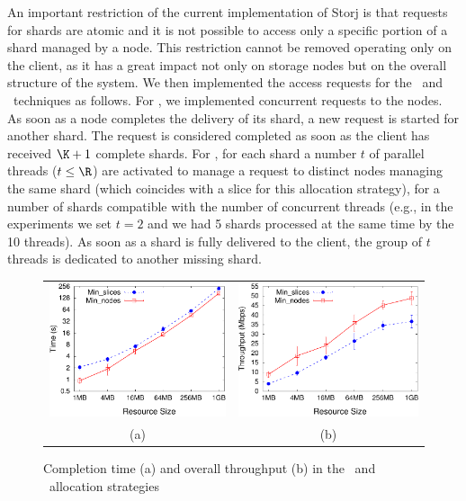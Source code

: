 An important restriction of the current implementation of Storj is
that requests for shards are atomic and it is not possible to access
only a specific portion of a shard managed by a node. This restriction
cannot be removed operating only on the client, as it has a great
impact not only on storage nodes but on the overall structure of the
system.  We then implemented the access requests for the
\diagonal\ and \compact\ techniques as follows.  For \compact, we
implemented concurrent requests to the nodes. As soon as a node
completes the delivery of its shard, a new request is started for
another shard. The request is considered completed as soon as the
client has received $\K+1$ complete shards. For \diagonal, for each
shard a number $t$ of parallel threads ($t \leq \R$) are activated to
manage a request to distinct nodes managing the same shard (which
coincides with a slice for this allocation strategy), for a number of
shards compatible with the number of concurrent threads (e.g., in the
experiments we set $t=2$ and we had 5 shards processed at the same
time by the 10 threads). As soon as a shard is fully delivered to the
client, the group of $t$ threads is dedicated to another missing
shard.

\begin{figure}[!t]
	\centering
	\hspace*{-8pt}
       \begin{tabular}{cc} \includegraphics[width=0.475\columnwidth]{./figures/bdfprs-fig09a} &
\includegraphics[width=0.475\columnwidth]{./figures/bdfprs-fig09b}\\[-3pt]
           \footnotesize{\hspace*{16pt}(a)} & \footnotesize{\hspace*{16pt}(b)}\\
       \end{tabular}
   \caption{\label{dcs:fig:exp1}Completion time (a) and overall throughput (b)
   in the \diagonal\ and \compact\ allocation strategies}
\end{figure}


